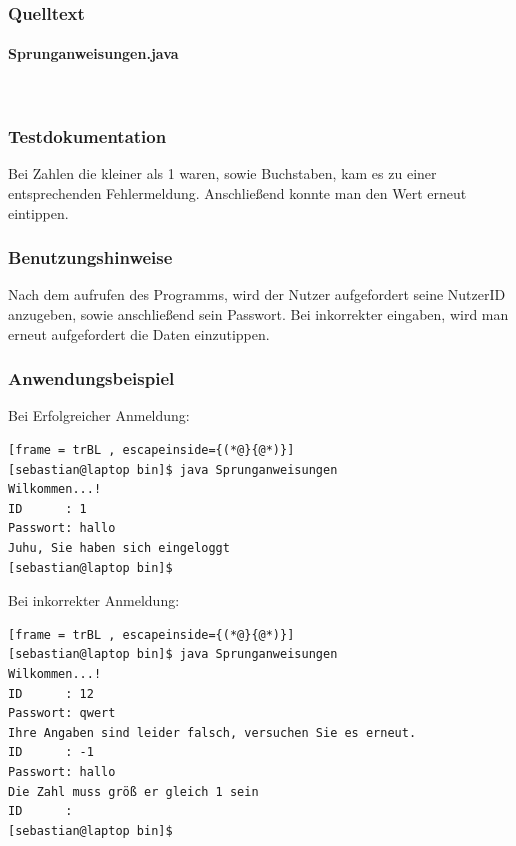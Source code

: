 \subsubsection{Quelltext}
\paragraph{Sprunganweisungen.java}\


\subsubsection{Testdokumentation}
Bei Zahlen die kleiner als 1 waren, sowie Buchstaben, kam es zu einer entsprechenden Fehlermeldung. Anschlie\ss end konnte man den Wert erneut eintippen.

\subsubsection{Benutzungshinweise}
Nach dem aufrufen des Programms, wird der Nutzer aufgefordert seine NutzerID anzugeben,
sowie anschlie\ss end sein Passwort. Bei inkorrekter eingaben, wird man erneut aufgefordert
die Daten einzutippen.

\subsubsection{Anwendungsbeispiel}
Bei Erfolgreicher Anmeldung:
\begin{lstlisting}[frame = trBL , escapeinside={(*@}{@*)}]
[sebastian@laptop bin]$ java Sprunganweisungen 	
Wilkommen...!
ID      : 1
Passwort: hallo
Juhu, Sie haben sich eingeloggt
[sebastian@laptop bin]$ 
\end{lstlisting}
Bei inkorrekter Anmeldung:
\begin{lstlisting}[frame = trBL , escapeinside={(*@}{@*)}]
[sebastian@laptop bin]$ java Sprunganweisungen 	
Wilkommen...!
ID      : 12
Passwort: qwert
Ihre Angaben sind leider falsch, versuchen Sie es erneut.
ID      : -1
Passwort: hallo
Die Zahl muss größ er gleich 1 sein
ID      : 
[sebastian@laptop bin]$ 
\end{lstlisting}